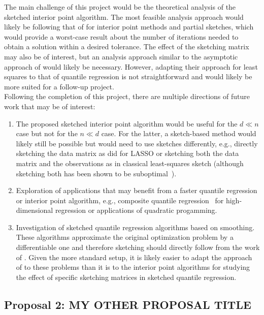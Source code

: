 The main challenge of this project would be the theoretical analysis of the sketched interior point algorithm. The most feasible analysis approach would likely be following that of \citet{Pilanci:2017} for interior point methods and partial sketches, which would provide a worst-case result about the number of iterations needed to obtain a solution within a desired tolerance. The effect of the sketching matrix may also be of interest, but an analysis approach similar to the asymptotic approach of \citet{Lacotte:2020} would likely be necessary. However, adapting their approach for least squares to that of quantile regression is not straightforward and would likely be more suited for a follow-up project.
\\

Following the completion of this project, there are multiple directions of future work that may be of interest:
\begin{enumerate}
\item
The proposed sketched interior point algorithm would be useful for the $d\ll n$ case but not for the $n\ll d$ case. For the latter, a sketch-based method would likely still be possible but would need to use sketches differently, e.g., directly sketching the data matrix as \citet{Pham:2015} did for LASSO or sketching both the data matrix and the observations as in classical least-squares sketch (although sketching both has been shown to be suboptimal~\citep{Pilanci:2016}).
\item
Exploration of applications that may benefit from a faster quantile regression or interior point algorithm, e.g., composite quantile regression~\citep{Zou:2008} for high-dimensional regression or applications of quadratic progamming.
\item
Investigation of sketched quantile regression algorithms based on smoothing. These algorithms approximate the original optimization problem by a differentiable one and therefore sketching should directly follow from the work of \citet{Pilanci:2017}. Given the more standard setup, it is likely easier to adapt the approach of \citet{Lacotte:2020} to these problems than it is to the interior point algorithms for studying the effect of specific sketching matrices in sketched quantile regression.
\end{enumerate}


\newpage


\subsection{Proposal 2: MY OTHER PROPOSAL TITLE} %

